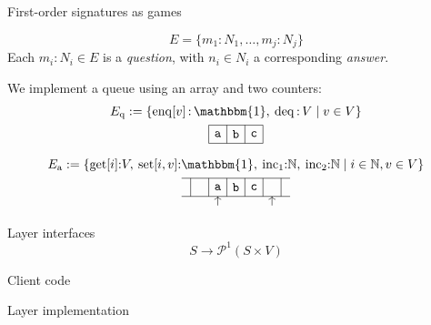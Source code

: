 \documentclass[aspectratio=141]{beamer}
\newcommand{\kw}[1]{\ensuremath{ \mathrm{#1} }}
\begin{document}
\begin{frame}{First-order signatures as games} %
  \begin{definition}[Signature]
  \[
    E = \{ m_1 \mathop{:} N_1, \ldots, m_j \mathop{:} N_j \}
  \]
  Each $m_i \mathop{:} N_i \in E$ is a \emph{question},
  with $n_i \in N_i$ a corresponding \emph{answer}.
  \end{definition}
  \pause
  \begin{example}
    We implement a queue using an array and two counters:
    \begin{gather*}
      E_\kw{q} := \{
        \kw{enq}[v] \mathop{:} \mathbbm{1}, \:
        \kw{deq} \mathop{:} V \mid
        v \in V \}
      \\
      \begin{tikzpicture}[scale=0.5]
        \draw (0,0) grid (3,1);
        \node at (0.5,0.5) {$\mathtt{a}$};
        \node at (1.5,0.5) {$\mathtt{b}$};
        \node at (2.5,0.5) {$\mathtt{c}$};
      \end{tikzpicture}
      \\[1ex]
      E_\kw{a} := \{
        \kw{get}[i] {:} V, \:
        \kw{set}[i,v] {:} \mathbbm{1}, \:
        \kw{inc}_1 {:} \mathbb{N}, \:
        \kw{inc}_2 {:} \mathbb{N}
        \mid i \in \mathbb{N}, v \in V \} \\
      \begin{tikzpicture}[scale=0.5]
        \draw (-0.5,0) grid (5.5,1);
        \node at (1.5,0.5) {$\mathtt{a}$};
        \node at (2.5,0.5) {$\mathtt{b}$};
        \node at (3.5,0.5) {$\mathtt{c}$};
        \draw[->] (1.5,-0.5) -- (1.5,0);
        \draw[->] (4.5,-0.5) -- (4.5,0);
      \end{tikzpicture}
    \end{gather*}
  \end{example}
\end{frame}

\begin{frame}{Layer interfaces}
\[
    S \rightarrow \mathcal{P}^1(S \times V)
\]
\end{frame}

\begin{frame}{Client code}

\end{frame}

\begin{frame}{Layer implementation}

\end{frame}
\end{document}

